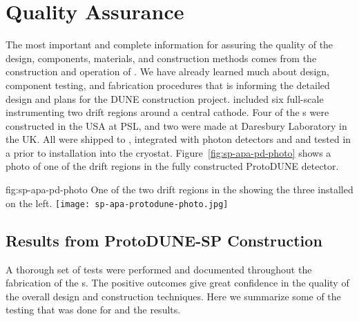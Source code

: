 \section{Quality Assurance}
\label{sec:fdsp-apa-qa}



The most important and complete information for assuring the quality of the  design, components, materials, and construction methods comes from the construction and operation of .  We have already learned much about design, component testing, and fabrication procedures that is informing the detailed design and plans for the DUNE  construction project.  included six full-scale   instrumenting two drift regions around a central cathode.  Four of the  s were constructed in the USA at %
PSL, and two were made at Daresbury Laboratory in the UK. All were shipped to , integrated with photon detectors and  and tested in a \coldbox prior to installation into the  cryostat.  Figure~\ref{fig:sp-apa-pd-photo} shows a photo of one of the drift regions in the fully constructed ProtoDUNE detector.

\begin{dunefigure}{fig:sp-apa-pd-photo}
{One of the two drift regions in the  showing the three installed  on the left.}
\texttt{[image: sp-apa-protodune-photo.jpg]}
\end{dunefigure}

\subsection{Results from ProtoDUNE-SP Construction}
\label{sec:fdsp-apa-qa-protodune-const}

A thorough set of  tests were performed and documented throughout the fabrication of the  s.  The positive outcomes give great confidence in the quality of the overall  design  and construction techniques.  Here we summarize some of the testing that was done for  and the results.   

